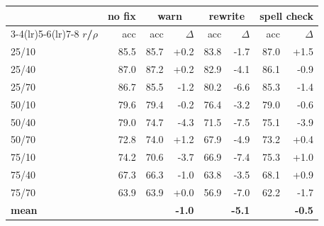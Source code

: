 \begin{tabular}{lr rr rr rr}
\toprule
& \textbf{no fix} & \multicolumn{2}{c}{\textbf{warn}} & \multicolumn{2}{c}{\textbf{rewrite}} & \multicolumn{2}{c}{\textbf{spell check}} \\
\cmidrule(lr){3-4}\cmidrule(lr){5-6}\cmidrule(lr){7-8}
\textbf{$r$/$\rho$} & acc & acc & $\Delta$ & acc & $\Delta$ & acc & $\Delta$ \\
\midrule
25/10 & 85.5 & 85.7 & +0.2 & 83.8 & -1.7 & 87.0 & +1.5 \\
25/40 & 87.0 & 87.2 & +0.2 & 82.9 & -4.1 & 86.1 & -0.9 \\
25/70 & 86.7 & 85.5 & -1.2 & 80.2 & -6.6 & 85.3 & -1.4 \\
50/10 & 79.6 & 79.4 & -0.2 & 76.4 & -3.2 & 79.0 & -0.6 \\
50/40 & 79.0 & 74.7 & -4.3 & 71.5 & -7.5 & 75.1 & -3.9 \\
50/70 & 72.8 & 74.0 & +1.2 & 67.9 & -4.9 & 73.2 & +0.4 \\
75/10 & 74.2 & 70.6 & -3.7 & 66.9 & -7.4 & 75.3 & +1.0 \\
75/40 & 67.3 & 66.3 & -1.0 & 63.8 & -3.5 & 68.1 & +0.9 \\
75/70 & 63.9 & 63.9 & +0.0 & 56.9 & -7.0 & 62.2 & -1.7 \\
\midrule \textbf{mean} & & & \textbf{-1.0} & & \textbf{-5.1} & & \textbf{-0.5} \\
\bottomrule
\end{tabular}
